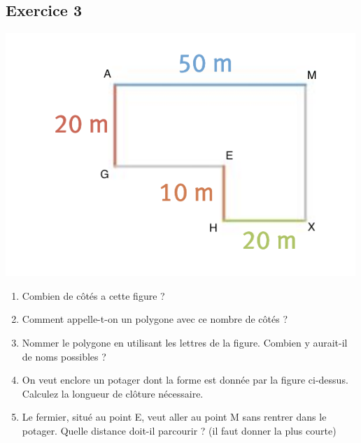 \documentclass[14 pt]{extarticle}
\theoremstyle{plain}
\begin{document}
 \subsection*{Exercice 3}
\includegraphics[scale=1]{Exo3}

\begin{enumerate}
\item Combien de côtés a cette figure ? 
\item Comment appelle-t-on un polygone avec ce nombre de côtés ? 
\item Nommer le polygone en utilisant les lettres de la figure. Combien y aurait-il de noms possibles ? 
\item On veut enclore un potager dont la forme est donnée par la figure ci-dessus. Calculez la longueur de clôture nécessaire. 
\item Le fermier, situé au point E, veut aller au point M sans rentrer dans le potager. Quelle distance doit-il parcourir ? (il faut donner la plus courte)
\end{enumerate}
 
 
 
 
 	
\end{document}
